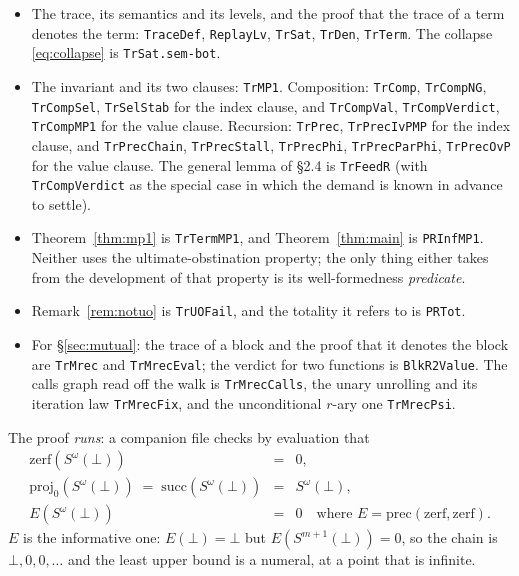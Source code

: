 \documentclass[11pt]{article}
\newcommand{\Sw}{S^{\omega}(\bot)}
\theoremstyle{definition}
\begin{document}
\begin{itemize}
\item The trace, its semantics and its levels, and the proof that the
  trace of a term denotes the term: \texttt{TraceDef}, \texttt{ReplayLv},
  \texttt{TrSat}, \texttt{TrDen}, \texttt{TrTerm}. The collapse
  \eqref{eq:collapse} is \texttt{TrSat.sem-bot}.
\item The invariant and its two clauses: \texttt{TrMP1}. Composition:
  \texttt{TrComp}, \texttt{TrCompNG}, \texttt{TrCompSel},
  \texttt{TrSelStab} for the index clause, and \texttt{TrCompVal},
  \texttt{TrCompVerdict}, \texttt{TrCompMP1} for the value clause.
  Recursion: \texttt{TrPrec}, \texttt{TrPrecIvPMP} for the index clause,
  and \texttt{TrPrecChain}, \texttt{TrPrecStall}, \texttt{TrPrecPhi},
  \texttt{TrPrecParPhi}, \texttt{TrPrecOvP} for the value clause. The
  general lemma of \S2.4 is \texttt{TrFeedR} (with
  \texttt{TrCompVerdict} as the special case in which the demand is known
  in advance to settle).
\item Theorem~\ref{thm:mp1} is \texttt{TrTermMP1}, and
  Theorem~\ref{thm:main} is \texttt{PRInfMP1}. Neither uses the
  ultimate-obstination property; the only thing either takes from the
  development of that property is its well-formedness \emph{predicate}.
\item Remark~\ref{rem:notuo} is \texttt{TrUOFail}, and the totality it
  refers to is \texttt{PRTot}.
\item For \S\ref{sec:mutual}: the trace of a block and the proof that it
  denotes the block are \texttt{TrMrec} and \texttt{TrMrecEval}; the
  verdict for two functions is \texttt{BlkR2Value}. The calls graph read
  off the walk is \texttt{TrMrecCalls}, the unary unrolling and its
  iteration law \texttt{TrMrecFix}, and the unconditional $r$-ary one
  \texttt{TrMrecPsi}.
\end{itemize}

The proof \emph{runs}: a companion file checks by evaluation that
\[
\begin{array}{lcl}
\mathrm{zerf}(\Sw) &=& 0,\\
\mathrm{proj}_0(\Sw) \;=\; \mathrm{succ}(\Sw) &=& \Sw,\\
E(\Sw) &=& 0 \quad\text{where } E = \mathrm{prec}(\mathrm{zerf},\mathrm{zerf}).
\end{array}
\]
$E$ is the informative one: $E(\bot) = \bot$ but $E(S^{m+1}(\bot)) = 0$,
so the chain is $\bot, 0, 0, \dots$ and the least upper bound is a
numeral, at a point that is infinite.
\end{document}
